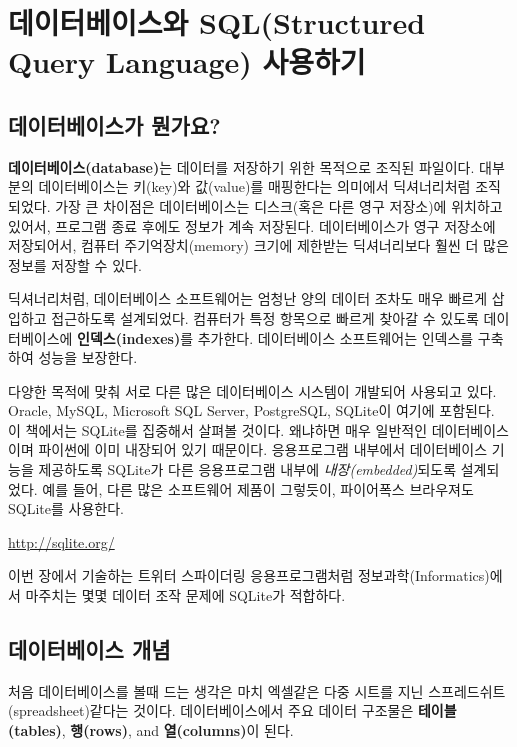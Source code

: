 
\chapter{데이터베이스와 SQL(Structured Query Language) 사용하기}

\section{데이터베이스가 뭔가요?}

{\bf 데이터베이스(database)}는 데이터를 저장하기 위한 목적으로 조직된 파일이다. 
대부분의 데이터베이스는 키(key)와 값(value)를 매핑한다는 의미에서 딕셔너리처럼 조직되었다.
가장 큰 차이점은 데이터베이스는 디스크(혹은 다른 영구 저장소)에 위치하고 있어서, 프로그램 종료 후에도 정보가 계속 저장된다.
데이터베이스가 영구 저장소에 저장되어서, 컴퓨터 주기억장치(memory) 크기에 제한받는 딕셔너리보다 훨씬 더 많은 정보를 저장할 수 있다.


딕셔너리처럼, 데이터베이스 소프트웨어는 엄청난 양의 데이터 조차도 매우 빠르게 삽입하고 접근하도록 설계되었다.
컴퓨터가 특정 항목으로 빠르게 찾아갈 수 있도록 데이터베이스에 {\bf 인덱스(indexes)}를 추가한다.
데이터베이스 소프트웨어는 인덱스를 구축하여 성능을 보장한다.

다양한 목적에 맞춰 서로 다른 많은 데이터베이스 시스템이 개발되어 사용되고 있다. 
Oracle, MySQL, Microsoft SQL Server, PostgreSQL, SQLite이 여기에 포함된다. 
이 책에서는 SQLite를 집중해서 살펴볼 것이다. 
왜냐하면 매우 일반적인 데이터베이스이며 파이썬에 이미 내장되어 있기 때문이다.
응용프로그램 내부에서 데이터베이스 기능을 제공하도록 SQLite가 다른 응용프로그램 내부에 \emph{내장(embedded)}되도록 설계되었다.
예를 들어, 다른 많은 소프트웨어 제품이 그렇듯이, 파이어폭스 브라우져도 SQLite를 사용한다.

\url{http://sqlite.org/}

이번 장에서 기술하는 트위터 스파이더링 응용프로그램처럼 정보과학(Informatics)에서 마주치는 몇몇 데이터 조작 문제에 SQLite가 적합하다.


\section{데이터베이스 개념}
처음 데이터베이스를 볼때 드는 생각은 마치 엑셀같은 다중 시트를 지닌 스프레드쉬트(spreadsheet)같다는 것이다.
데이터베이스에서 주요 데이터 구조물은 {\bf 테이블(tables)}, {\bf 행(rows)}, and {\bf 열(columns)}이 된다. 

